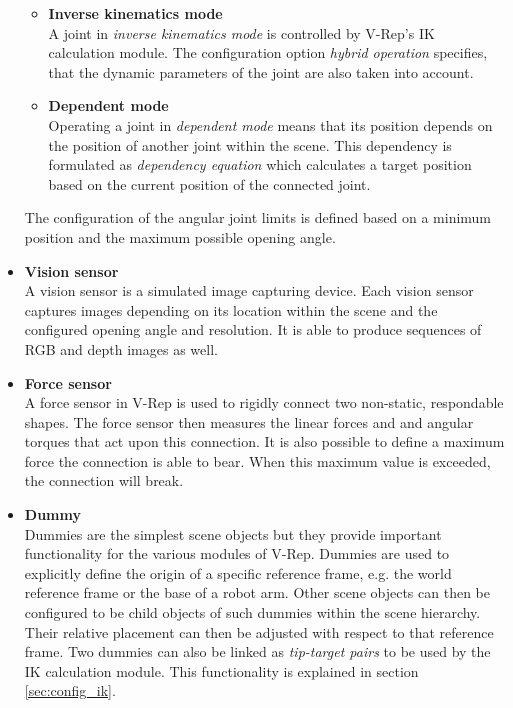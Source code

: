 \begin{itemize}
\begin{itemize}
\item \textbf{Inverse kinematics mode} \\
A joint in \emph{inverse kinematics mode} is controlled by V-Rep's IK calculation module. The configuration option \emph{hybrid operation} specifies, that the dynamic parameters of the joint are also taken into account.

\item \textbf{Dependent mode} \\
Operating a joint in \emph{dependent mode} means that its position depends on the position of another joint within the scene. This dependency is formulated as \emph{dependency equation} which calculates a target position based on the current position of the connected joint.

\end{itemize}
The configuration of the angular joint limits is defined based on a minimum position and the maximum possible opening angle. 

\item \textbf{Vision sensor} \\
A vision sensor is a simulated image capturing device. Each vision sensor captures images depending on its location within the scene and the configured opening angle and resolution. It is able to produce sequences of RGB and depth images as well.

\item \textbf{Force sensor} \\
A force sensor in V-Rep is used to rigidly connect two non-static, respondable shapes. The force sensor then measures the linear forces and and angular torques that act upon this connection. It is also possible to define a maximum force the connection is able to bear. When this maximum value is exceeded, the connection will break.

\item \textbf{Dummy} \\
Dummies are the simplest scene objects but they provide important functionality for the various modules of V-Rep. Dummies are used to explicitly define the origin of a specific reference frame, e.g. the world reference frame or the base of a robot arm. Other scene objects can then be configured to be child objects of such dummies within the scene hierarchy. Their relative placement can then be adjusted with respect to that reference frame. Two dummies can also be linked as \emph{tip-target pairs} to be used by the IK calculation module. This functionality is explained in section \ref{sec:config_ik}.

\end{itemize}


